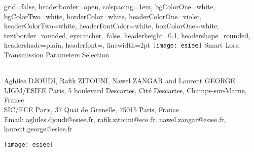 \documentclass[a0paper,portrait]{setup/styles/baposter}
\begin{document}
\begin{poster}{
    grid=false,
    headerborder=open,           %
    colspacing=1em,              %
    bgColorOne=white,            %
    bgColorTwo=white,            %
    borderColor=white,           %
    headerColorOne=violet,       %
    headerColorTwo=white,        %
    headerFontColor=white,       %
    boxColorOne=white,           %
    textborder=rounded,          %
    eyecatcher=false,            %
    headerheight=0.1\textheight, %
    headershape=rounded,         %
    headershade=plain,
    headerfont=\Large\textsf,    %
    linewidth=2pt                %
}{
    \texttt{[image: esiee]}
}{
   \textsf{Smart Lora Transmission Parameters Selection}
}{
    \sf\vspace{0.2em}\\
    Aghiles DJOUDI, Rafik ZITOUNI, Nawel ZANGAR and Laurent GEORGE
    \vspace{0.3em}\\
    \small{
        LIGM/ESIEE Paris, 5 boulevard Descartes, Cité Descartes, Champs-sur-Marne, France\\
        SIC/ECE Paris, 37 Quai de Grenelle, 75015 Paris, France
        \vspace{0.3em}\\
    }
    Email:   aghiles.djoudi@esiee.fr, rafik.zitouni@ece.fr, nawel.zangar@esiee.fr, laurent.george@esiee.fr

}{
    \texttt{[image: esiee]}
}


\end{poster}
\end{document}
